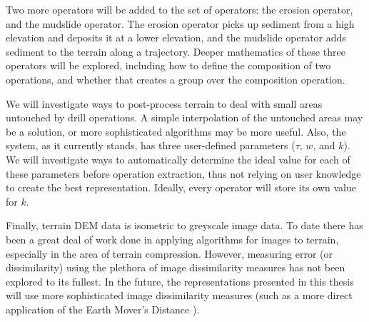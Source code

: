 
Two more operators will be added to the set of operators: the erosion operator, and the mudslide operator. The erosion operator picks up sediment from a high elevation and deposits it at a lower elevation, and the mudslide operator adds sediment to the terrain along a trajectory. Deeper mathematics of these three operators will be explored, including how to define the composition of two operations, and whether that creates a group over the composition operation.  

We will investigate ways to post-process terrain to deal with small areas untouched by drill operations. A simple interpolation of the untouched areas may be a solution, or more sophisticated algorithms may be more useful. Also, the system, as it currently stands, has three user-defined parameters ($\tau$, $w$, and $k$). We will investigate ways to automatically determine the ideal value for each of these parameters before operation extraction, thus not relying on user knowledge to create the best representation. Ideally, every operator will store its own value for $k$.

Finally, terrain DEM data is isometric to greyscale image data. To date there has been a great deal of work done in applying algorithms for images to terrain, especially in the area of terrain compression. However, measuring error (or dissimilarity) using the plethora of image dissimilarity measures has not been explored to its fullest. In the future, the representations presented in this thesis will use more sophisticated image dissimilarity measures (such as a more direct application of the Earth Mover's Distance \cite{Rubner:2000:EMD:365875.365881}).